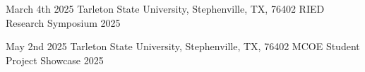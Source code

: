 {March 4th}
{2025}
{Tarleton State University, Stephenville, TX, 76402}
{RIED Research Symposium 2025 }
{ }
{
\jbegin
\jend
}

{May 2nd}
{2025}
{Tarleton State University, Stephenville, TX, 76402}
{MCOE Student Project Showcase 2025}
{ }
{
\jbegin
\jend
}


\def\skills{
    \jbegin
        \setlength{\itemsep}{.1em} 
        \jitem{Operating Systems:  Windows 10, Windows 11, Ubuntu, Kali-Linux}
        \jitem{Languages:   C, C++, Java, Python, SQL, JavaScript, Bash, KQL, Php, LaTex}
    \jend
}








